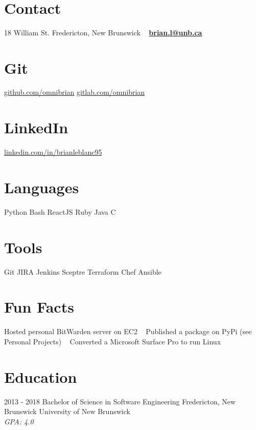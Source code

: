 \documentclass[a4paper]{resume}
\begin{document}


\begin{aside}
    ~
    ~
    ~
    ~
    ~
  \section{Contact}
    18 William St.
    Fredericton,
    New Brunswick
    ~
    \textbf{\href{mailto:brian.l@unb.ca}{brian.l@unb.ca}}
    ~
  \section{Git}
    \href{https://github.com/omnibrian}{github.com/omnibrian}
    \href{https://gitlab.com/omnibrian}{gitlab.com/omnibrian}
    ~
  \section{LinkedIn}
    \href{https://www.linkedin.com/in/brianleblanc95/}{linkedin.com/in/brianleblanc95}
    ~
  \section{Languages}
    Python
    Bash
    ReactJS
    Ruby
    Java
    C
    ~
  \section{Tools}
    Git
    JIRA
    Jenkins
    Sceptre
    Terraform
    Chef
    Ansible
    ~
  \section{Fun Facts}
    Hosted personal BitWarden server on EC2
    ~
    Published a package on PyPi (see Personal Projects)
    ~
    Converted a Microsoft Surface Pro to run Linux
    ~
\end{aside}

\section{Education}
\begin{entrylist}
  \entry
    {2013 - 2018}
    {Bachelor of Science in Software Engineering}
    {Fredericton, New Brunswick}
    {University of New Brunswick\\
    \emph{GPA: 4.0}}
\end{entrylist}
\end{document}
